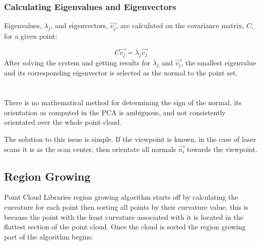 		\subsubsection{Calculating Eigenvalues and Eigenvectors}
			Eigenvalues, $\lambda_j$, and eigenvectors, $\vec{v_j}$, are calculated on the covariance matrix, $C$, for a given point:
			
			\begin{equation}
			C \vec{v_j} = \lambda_j \vec{v_j}
			\end{equation}
			After solving the system and getting results for $\lambda_j$ and $\vec{v_j}$, the smallest eigenvalue and its corresponding eigenvector is selected as the normal to the point set.\\
			\\
			\\
			There is no mathematical method for determining the sign of the normal, its orientation as computed in the PCA is ambiguous, and not consistently orientated over the whole point cloud. 
			
			The solution to this issue is simple. If the viewpoint is known, in the case of laser scans it is as the scan center, then orientate all normals $\vec{n_i}$ towards the viewpoint.

				
	\subsection{Region Growing}
	
		Point Cloud Libraries region growing algorithm starts off by calculating the curvature for each point then sorting all points by their curvature value. this is because the point with the least curvature associated with it is located in the flattest section of the point cloud. Once the cloud is sorted the region growing part of the algorithm begins:
		
